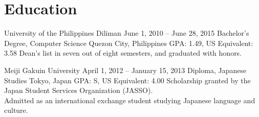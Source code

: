 \section*{Education}

\academelite
	{University of the Philippines Diliman}
	{June 1, 2010 -- June 28, 2015}
	{Bachelor's Degree, Computer Science}
	{Quezon City, Philippines}
	{GPA: 1.49, US Equivalent: 3.58}
	{Dean's list in seven out of eight semesters, and graduated with honors.}

\academelite
	{Meiji Gakuin University}
	{April 1, 2012 -- January 15, 2013}
	{Diploma, Japanese Studies}
	{Tokyo, Japan}
	{GPA: S, US Equivalent: 4.00}
	{Scholarship granted by the Japan Student Services Organization (JASSO). \\
    Admitted as an international exchange student studying Japanese language and culture.}
	
